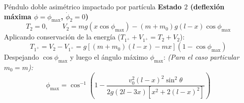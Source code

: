 \begin{solucion}{Péndulo doble asimétrico impactado por partícula}
\textbf{Estado $2$ (deflexión máxima $\phi = \phi_{\max}$, $\dot{\phi}_2 = 0$)}
$$T_2 = 0, \qquad V_2 = mg(x\cos\phi_{\max}) - (m + m_0)g(l - x)\cos\phi_{\max}$$
Aplicando conservación de la energía ($T_{1^+} + V_{1^+} = T_2 + V_2$):
$$T_{1^+} = V_2 - V_{1^+} = g\left[ (m + m_0)(l - x) - mx \right] (1 - \cos\phi_{\max})$$
Despejando $\cos\phi_{\max}$ y luego el ángulo máximo $\phi_{\max}$:
\emph{(Para el caso particular $m_0 = m$):}
$$\phi_{\max} = \cos^{-1}\left( 1 - \frac{v_0^2 (l - x)^2 \sin^2\theta}{2g(2l - 3x)\left[ x^2 + 2(l - x)^2 \right]} \right)$$

\end{solucion}
